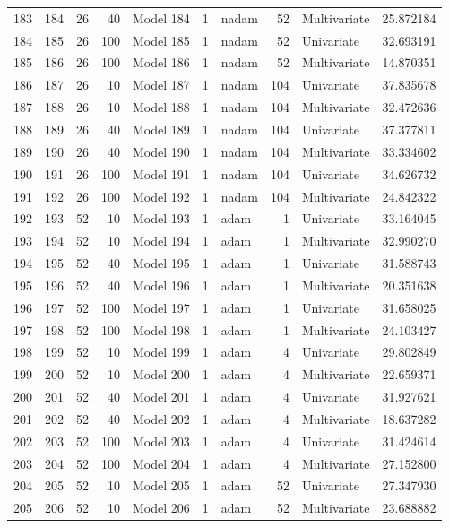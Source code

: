 \begin{tabular}{lrrrlrlrlr}
183 & 184 & 26 & 40 & Model 184 & 1 & nadam & 52 & Multivariate & 25.872184 \\
184 & 185 & 26 & 100 & Model 185 & 1 & nadam & 52 & Univariate & 32.693191 \\
185 & 186 & 26 & 100 & Model 186 & 1 & nadam & 52 & Multivariate & 14.870351 \\
186 & 187 & 26 & 10 & Model 187 & 1 & nadam & 104 & Univariate & 37.835678 \\
187 & 188 & 26 & 10 & Model 188 & 1 & nadam & 104 & Multivariate & 32.472636 \\
188 & 189 & 26 & 40 & Model 189 & 1 & nadam & 104 & Univariate & 37.377811 \\
189 & 190 & 26 & 40 & Model 190 & 1 & nadam & 104 & Multivariate & 33.334602 \\
190 & 191 & 26 & 100 & Model 191 & 1 & nadam & 104 & Univariate & 34.626732 \\
191 & 192 & 26 & 100 & Model 192 & 1 & nadam & 104 & Multivariate & 24.842322 \\
192 & 193 & 52 & 10 & Model 193 & 1 & adam & 1 & Univariate & 33.164045 \\
193 & 194 & 52 & 10 & Model 194 & 1 & adam & 1 & Multivariate & 32.990270 \\
194 & 195 & 52 & 40 & Model 195 & 1 & adam & 1 & Univariate & 31.588743 \\
195 & 196 & 52 & 40 & Model 196 & 1 & adam & 1 & Multivariate & 20.351638 \\
196 & 197 & 52 & 100 & Model 197 & 1 & adam & 1 & Univariate & 31.658025 \\
197 & 198 & 52 & 100 & Model 198 & 1 & adam & 1 & Multivariate & 24.103427 \\
198 & 199 & 52 & 10 & Model 199 & 1 & adam & 4 & Univariate & 29.802849 \\
199 & 200 & 52 & 10 & Model 200 & 1 & adam & 4 & Multivariate & 22.659371 \\
200 & 201 & 52 & 40 & Model 201 & 1 & adam & 4 & Univariate & 31.927621 \\
201 & 202 & 52 & 40 & Model 202 & 1 & adam & 4 & Multivariate & 18.637282 \\
202 & 203 & 52 & 100 & Model 203 & 1 & adam & 4 & Univariate & 31.424614 \\
203 & 204 & 52 & 100 & Model 204 & 1 & adam & 4 & Multivariate & 27.152800 \\
204 & 205 & 52 & 10 & Model 205 & 1 & adam & 52 & Univariate & 27.347930 \\
205 & 206 & 52 & 10 & Model 206 & 1 & adam & 52 & Multivariate & 23.688882 \\

\end{tabular}
